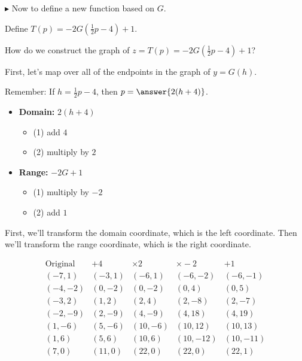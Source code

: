 \documentclass{ximera}
\begin{document}
\begin{example}
$\blacktriangleright$ Now to define a new function based on  $G$.






Define  $T(p) = -2G\left( \frac{1}{2} p - 4 \right) + 1$.


How do we construct the graph of $z = T(p) = -2G\left(\frac{1}{2} p - 4\right) + 1$?

First, let's map over all of the endpoints in the graph of $y = G(h)$.

Remember: If  $h = \frac{1}{2} p - 4$, then $p = \answer{2(h+4)}$.

\begin{itemize}
 \item \textbf{Domain:}  $2 (h+4)$ 
    \begin{itemize}
      \item (1) add $4$
      \item (2) multiply by $2$
    \end{itemize}

 \item \textbf{Range:}  $-2 G + 1$ 
    \begin{itemize}
      \item (1) multiply by $-2$
      \item (2) add $1$
    \end{itemize}
\end{itemize}


First, we'll transform the domain coordinate, which is the left coordinate.  Then we'll transform the range coordinate, which is the right coordinate.

\[
\begin{array}{ccccc}
\text{Original}  &  +4           &  \times2   &  \times-2  & + 1          \\
\hline
(-7, 1)          &  (-3, 1)      &  (-6, 1)     &  (-6, -2)    &  (-6,-1)     \\
(-4, -2)         &  (0, -2)      &  (0, -2)     &  (0,4)      &  (0,5)       \\
(-3,2)           &  (1,2)        &  (2,4)       &  (2,-8)     &  (2,-7)     \\
(-2,-9)          &  (2, -9)      &  (4,-9)      &  (4, 18)    &  (4,19)      \\
(1,-6)           &  (5,-6)       &  (10,-6)     &  (10,12)    &  (10,13)     \\
(1,6)            &  (5, 6)       &  (10,6)      &  (10,-12)   &  (10,-11)   \\
(7,0)            &  (11,0)       &  (22,0)      &  (22,0)     &  (22,1)
\end{array}
\]





\end{example}
\end{document}
